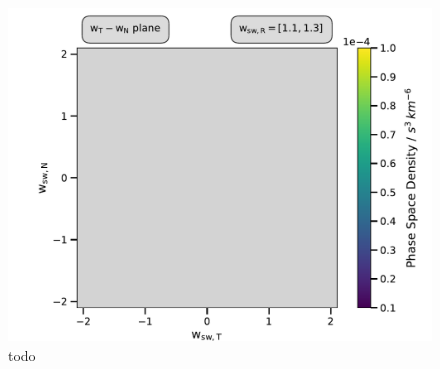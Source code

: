 \begin{figure}[h]
	\includegraphics[width=1.\textwidth]{Figures/slices_50_11.pdf}
	\centering
	\caption{todo}
	\label{fig:todo}
\end{figure}

